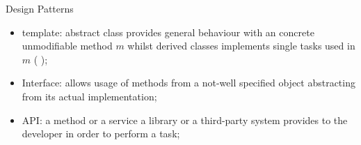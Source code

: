 \begin{frame}{Design Patterns}
    \begin{itemize}
        \item template: abstract class provides general behaviour with an concrete unmodifiable method $m$ whilst derived classes implements single tasks used in $m$ (\eg{} );
        \item Interface: allows usage of methods from a not-well specified object abstracting from its actual implementation;
        \item API: a method or a service a library or a third-party system provides to the developer in order to perform a task;
    \end{itemize}
\end{frame}